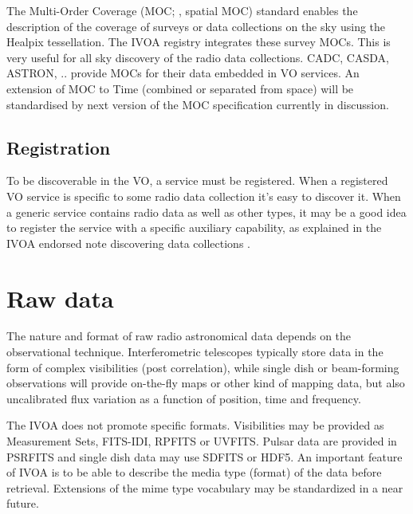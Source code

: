 \documentclass[11pt,a4paper]{ivoa}
\begin{document}
The Multi-Order Coverage (MOC; \cite{2019ivoa.spec.1007F}, spatial MOC) standard enables the description of the coverage of surveys or data collections on the sky using the Healpix tessellation. The IVOA registry integrates these survey MOCs. This is very useful for all sky discovery of the radio data collections. CADC, CASDA, ASTRON, .. provide MOCs for their data embedded in VO services. An extension of MOC to Time (combined or separated from space) will be standardised by next version of the MOC specification currently in discussion.

\subsection{Registration} 
To be discoverable in the VO, a service must be registered.
When a registered VO service is specific to some radio data collection it's easy to discover it. When a generic service contains radio data as well as other types, it may be a good idea to register the service with a specific auxiliary capability, as explained in the IVOA endorsed note discovering data collections \citep{2019ivoa.rept.0520D}.

\section{Raw data}
The nature and format of raw radio astronomical data 
depends on the observational technique. Interferometric telescopes typically store data in the form of complex visibilities (post correlation), while single dish or beam-forming observations will provide on-the-fly maps or other kind of mapping data, but also uncalibrated flux variation as a function of position, time and frequency. 

The IVOA does not promote specific formats. Visibilities may be provided as Measurement Sets, FITS-IDI, RPFITS or UVFITS. Pulsar data are provided in PSRFITS and single dish data may use SDFITS or HDF5. An important feature of IVOA is to be able to describe the media type (format) of the data before retrieval. Extensions of the mime type vocabulary may be standardized in a near future.  
\end{document}
